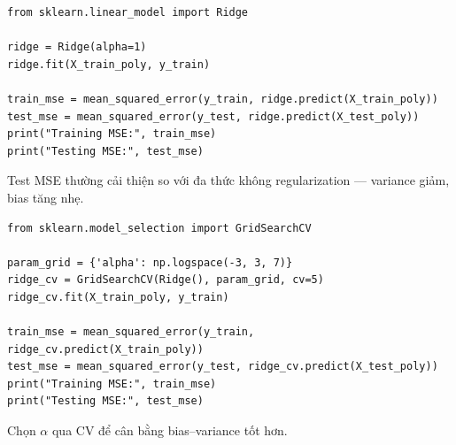 \begin{vidu}[title={Giảm variance --- Ridge Regression}]
\begin{lstlisting}
from sklearn.linear_model import Ridge

ridge = Ridge(alpha=1)
ridge.fit(X_train_poly, y_train)

train_mse = mean_squared_error(y_train, ridge.predict(X_train_poly))
test_mse = mean_squared_error(y_test, ridge.predict(X_test_poly))
print("Training MSE:", train_mse)
print("Testing MSE:", test_mse)
\end{lstlisting}

Test MSE thường cải thiện so với đa thức không regularization --- variance giảm, bias tăng nhẹ.
\end{vidu}

\begin{vidu}[title={Tối ưu $\alpha$ --- GridSearchCV}]
\begin{lstlisting}
from sklearn.model_selection import GridSearchCV

param_grid = {'alpha': np.logspace(-3, 3, 7)}
ridge_cv = GridSearchCV(Ridge(), param_grid, cv=5)
ridge_cv.fit(X_train_poly, y_train)

train_mse = mean_squared_error(y_train, ridge_cv.predict(X_train_poly))
test_mse = mean_squared_error(y_test, ridge_cv.predict(X_test_poly))
print("Training MSE:", train_mse)
print("Testing MSE:", test_mse)
\end{lstlisting}

Chọn $\alpha$ qua CV để cân bằng bias--variance tốt hơn.
\end{vidu}
